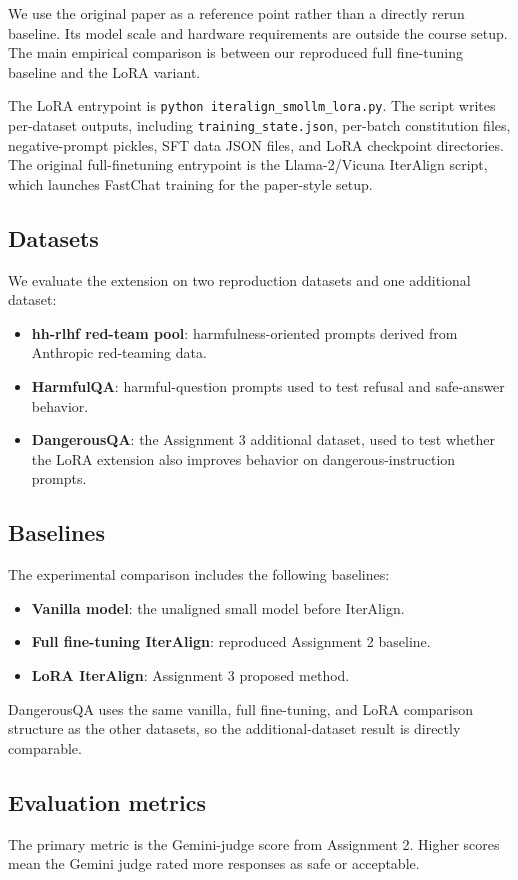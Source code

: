 \documentclass[11pt]{article}
\begin{document}
We use the original paper as a reference point rather than a directly rerun baseline. Its model scale and hardware requirements are outside the course setup. The main empirical comparison is between our reproduced full fine-tuning baseline and the LoRA variant.

The LoRA entrypoint is \texttt{python iteralign\_smollm\_lora.py}. The script writes per-dataset outputs, including \texttt{training\_state.json}, per-batch constitution files, negative-prompt pickles, SFT data JSON files, and LoRA checkpoint directories. The original full-finetuning entrypoint is the Llama-2/Vicuna IterAlign script, which launches FastChat training for the paper-style setup.

\subsection{Datasets}
We evaluate the extension on two reproduction datasets and one additional dataset:
\begin{itemize}
  \item \textbf{hh-rlhf red-team pool}: harmfulness-oriented prompts derived from Anthropic red-teaming data.
  \item \textbf{HarmfulQA}: harmful-question prompts used to test refusal and safe-answer behavior.
  \item \textbf{DangerousQA}: the Assignment 3 additional dataset, used to test whether the LoRA extension also improves behavior on dangerous-instruction prompts.
\end{itemize}

\subsection{Baselines}
The experimental comparison includes the following baselines:
\begin{itemize}
  \item \textbf{Vanilla model}: the unaligned small model before IterAlign.
  \item \textbf{Full fine-tuning IterAlign}: reproduced Assignment 2 baseline.
  \item \textbf{LoRA IterAlign}: Assignment 3 proposed method.
\end{itemize}

DangerousQA uses the same vanilla, full fine-tuning, and LoRA comparison structure as the other datasets, so the additional-dataset result is directly comparable.

\subsection{Evaluation metrics}
The primary metric is the Gemini-judge score from Assignment 2. Higher scores mean the Gemini judge rated more responses as safe or acceptable.
\end{document}
